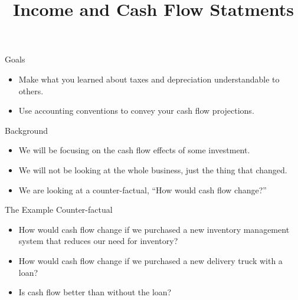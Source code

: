 \documentclass[ignorenonframetext,]{beamer}
\title{Income and Cash Flow Statments}
\date{}
\providecommand{\tightlist}{%
  \setlength{\itemsep}{0pt}\setlength{\parskip}{0pt}}
\begin{document}
\frame{\titlepage}

\begin{frame}{Goals}

\begin{itemize}
\tightlist
\item
  Make what you learned about taxes and depreciation understandable to
  others.
\item
  Use accounting conventions to convey your cash flow projections.
\end{itemize}

\end{frame}

\begin{frame}{Background}

\begin{itemize}
\tightlist
\item
  We will be focusing on the cash flow effects of some investment.
\item
  We will not be looking at the whole business, just the thing that
  changed.
\item
  We are looking at a counter-factual, ``How would cash flow change?''
\end{itemize}

\end{frame}

\begin{frame}{The Example Counter-factual}

\begin{itemize}
\tightlist
\item
  How would cash flow change if we purchased a new inventory management
  system that reduces our need for inventory?
\item
  How would cash flow change if we purchased a new delivery truck with a
  loan?\\
\item
  Is cash flow better than without the loan?
\end{itemize}

\end{frame}
\end{document}
